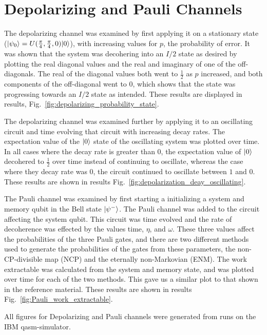 \documentclass[12pt]{article}
\DeclarePairedDelimiter{\ket}{\lvert}{\rangle}
\begin{document}
  \section{Depolarizing and Pauli Channels}

  The depolarizing channel was examined by first applying it on a stationary state (\( \ket{\psi_{0}} = U(\frac{\pi}{4}, \frac{\pi}{4}, 0) \ket{0} \)), with increasing values for \( p \), the probability of error. It was shown that the system was decohering into an \( I / 2 \) state as desired by plotting the real diagonal values and the real and imaginary of one of the off-diagonals. The real of the diagonal values both went to \( \frac{1}{2} \) as \( p \) increased, and both components of the off-diagonal went to \( 0 \), which shows that the state was progressing towards an \( I / 2 \) state as intended. These results are displayed in results, Fig.~\ref{fig:depolarizing_probability_state}. 

  The depolarizing channel was examined further by applying it to an oscillating circuit and time evolving that circuit with increasing decay rates. The expectation value of the \( \ket{0} \) state of the oscillating system was plotted over time. In all cases where the decay rate is greater than \( 0 \), the expectation value of \( \ket{0} \) decohered to \( \frac{1}{2} \) over time instead of continuing to oscillate, whereas the case where they decay rate was \( 0 \), the circuit continued to oscillate between \( 1 \) and \( 0 \). These results are shown in results Fig.~\ref{fig:depolarization_deay_oscillating}.

  The Pauli channel was examined by first starting a initializing a system and memory qubit in the Bell state \( \ket{\psi^{-}} \). The Pauli channel was added to the circuit affecting the system qubit. This circuit was time evolved and the rate of decoherence was effected by the values time, \( \eta \), and \( \omega \). These three values affect the probabilities of the three Pauli gates, and there are two different methods used to generate the probabilities of the gates from these parameters, the non-CP-divisible map (NCP) and the eternally non-Markovian (ENM). The work extractable was calculated from the system and memory state, and was plotted over time for each of the two methods. This gave us a similar plot to that shown in the reference material. These results are shown in results Fig.~\ref{fig:Pauli_work_extractable}.

  All figures for Depolarizing and Pauli channels were generated from runs on the IBM qasm-simulator.
\end{document}
